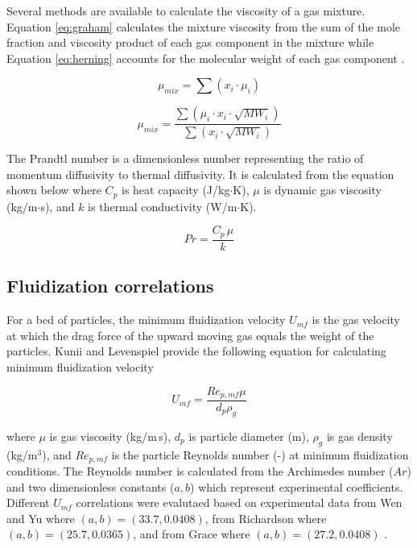 Several methods are available to calculate the viscosity of a gas mixture. Equation \ref{eq:graham} calculates the mixture viscosity from the sum of the mole fraction and viscosity product of each gas component in the mixture \cite{Graham-1846} while Equation \ref{eq:herning} accounts for the molecular weight of each gas component \cite{Herning-1936}.

\begin{equation}\label{eq:graham}
    \mu_{mix} = \sum(x_i \cdot \mu_i)
\end{equation}

\begin{equation}\label{eq:herning}
    \mu_{mix} = \frac{\sum(\mu_i \cdot x_i \cdot \sqrt{MW_i})}{\sum(x_i \cdot \sqrt{MW_i})}
\end{equation}

The Prandtl number is a dimensionless number representing the ratio of momentum diffusivity to thermal diffusivity. It is calculated from the equation shown below where $C_p$ is heat capacity (J/kg$\cdot$K), $\mu$ is dynamic gas viscosity (kg/m$\cdot$s), and $k$ is thermal conductivity (W/m$\cdot$K).

\begin{equation}
    Pr = \frac{C_p\, \mu}{k}
\end{equation}

\subsection{Fluidization correlations}

For a bed of particles, the minimum fluidization velocity $U_{mf}$ is the gas velocity at which the drag force of the upward moving gas equals the weight of the particles. Kunii and Levenspiel \cite{Levenspiel-1991} provide the following equation for calculating minimum fluidization velocity

\begin{equation}
    U_{mf} = \frac{Re_{p,mf} \mu}{d_p \rho_g}
\end{equation}

\noindent where $\mu$ is gas viscosity (kg/m\,s), $d_p$ is particle diameter (m), $\rho_g$ is gas density (kg/m$^3$), and $Re_{p,mf}$ is the particle Reynolds number (-) at minimum fluidization conditions. The Reynolds number is calculated from the Archimedes number ($Ar$) and two dimensionless constants ($a, b$) which represent experimental coefficients. Different $U_{mf}$ correlations were evalutaed based on experimental data from Wen and Yu where $(a, b) = (33.7, 0.0408)$, from Richardson where $(a, b) = (25.7, 0.0365)$, and from Grace where $(a, b) = (27.2, 0.0408)$ \cite{Levenspiel-1991}.

